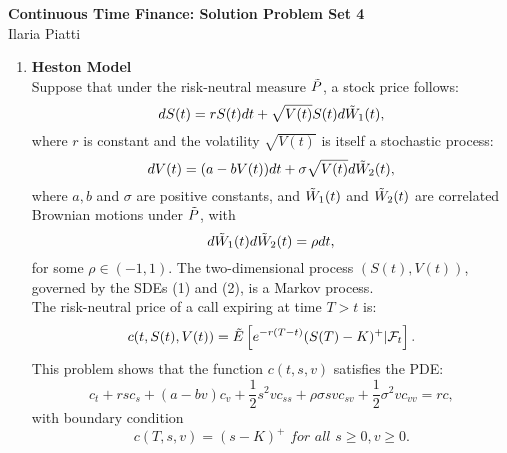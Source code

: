 \documentclass[11pt,a4,table]{article}
\begin{document}
\vspace*{-0.7in}

\begin{center}
 \textbf{Continuous Time Finance: Solution Problem Set 4} \\
Ilaria Piatti 
\end{center} 


\begin{enumerate}
    \item \textbf{Heston Model} \\
    Suppose that under the risk-neutral measure $\Tilde{P}$, a stock price follows:
    \begin{equation}
        dS(t) = rS(t) dt + \sqrt{V(t)} S(t) d\Tilde{W}_1(t),
    \end{equation}
    where $r$ is constant and the volatility $\sqrt{V(t)}$ is itself a stochastic process:
    \begin{equation}
        dV(t) = (a - bV(t)) dt + \sigma \sqrt{V(t)} d\Tilde{W}_2(t),
    \end{equation}
    where $a,b$ and $\sigma$ are positive constants, and $\Tilde{W}_1(t)$ and $\Tilde{W}_2(t)$ are correlated Brownian motions under $\Tilde{P}$, with
    \begin{equation*}
        d\Tilde{W}_1(t) d\Tilde{W}_2(t) = \rho dt,
    \end{equation*}
    for some $\rho\in(-1,1)$. The two-dimensional process $(S(t), V(t))$, governed by the SDEs (1) and (2), is a Markov process.\\
    The risk-neutral price of a call expiring at time $T>t$ is:
    \begin{equation*}
        c(t,S(t), V(t)) = \Tilde{E}\left[e^{-r(T-t)}(S(T)-K)^+|\mathcal{F}_t\right].
    \end{equation*}
    This problem shows that the function $c(t,s,v)$ satisfies the PDE:
    \begin{equation}
        c_t + rsc_s + (a-bv)c_v + \frac{1}{2}s^2 vc_{ss} + \rho \sigma svc_{sv} + \frac{1}{2}\sigma^2 vc_{vv} = rc,
    \end{equation}
    with boundary condition
    \begin{equation}
        c(T,s,v) = (s-K)^+ \textit{ for all } s\geq 0, v\geq 0. 
    \end{equation}
    

\end{enumerate}
\end{document}
